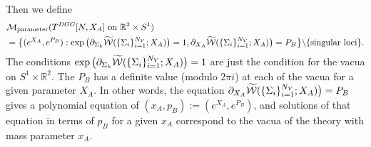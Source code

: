 \documentclass[a4paper,11pt]{article}
\def\cT{\mathcal{T}}
\def\BR{{\mathbb R}}
\def\alert#1{{\color{red}[#1]}}
\begin{document}
\eeq
Then we define
%
\begin{align}
\begin{split}
&\mathcal{M}_{\rm parameter}(\textrm{$T^{DGG}[N,X_A]$ on $\mathbb{R}^2\times S^1$})
\\
&=  \big{\{} 
(e^{X_A},e^{P_B}) : \exp \big{(}  \partial_{\Sigma_k}\widetilde{\mathcal{W}}( \{\Sigma_i\}_{i=1}^{N_V} ; X_A) \big{)}=1, 
\partial_{X_A}\widetilde{\mathcal{W}}( \{\Sigma_i\}_{i=1}^{N_V} ; X_A) \big{)}=P_B
\big{\}} 
\backslash \{ \textrm{singular loci}\}.
\end{split}
\end{align}
The conditions $\exp \big{(}  \partial_{\Sigma_k}\widetilde{\mathcal{W}}( \{\Sigma_i\}_{i=1}^{N_V} ; X_A) \big{)}=1$ are just the 
condition for the vacua on $S^1 \times \BR^2$. The $P_B$ has a definite value (modulo $2\pi i$) at each of the vacua for a given parameter $X_A$.
In other words, the equation $\partial_{X_A}\widetilde{\mathcal{W}}( \{\Sigma_i\}_{i=1}^{N_V} ; X_A) \big{)}=P_B$ gives a polynomial equation
of $(x_A, p_B):=(e^{X_A},e^{P_B})$, and solutions of that equation in terms of $p_B$ for a given $x_A$ correspond to the vacua of the theory with mass parameter $x_A$.

%
%


\end{document}
